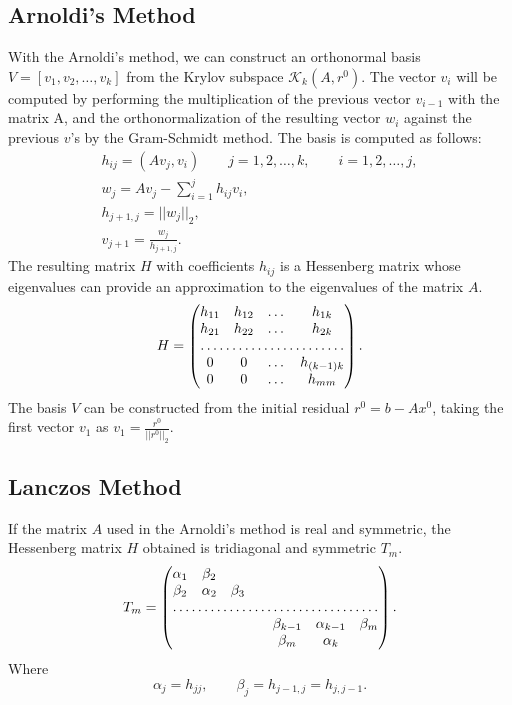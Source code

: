 \documentclass[a4paper,10pt]{report}
\begin{document}
\subsection{Arnoldi's Method}
With the Arnoldi’s method, we can construct an orthonormal basis $V=[v_1,v_2,\dots, v_k]$ from the Krylov subspace $\mathcal{K}_k(A,r^0)$.
The vector $v_i$ will be computed by performing the multiplication of the previous vector $v_{i-1}$ with the matrix A, and the orthonormalization of the resulting vector $w_i$ against the previous $v$’s by the Gram-Schmidt method. The basis is computed as follows:
\begin{gather*}
h_{ij}=(Av_j,v_i)\qquad j=1,2,\dots, k,\qquad i=1,2,\dots,j,\\
w_j=Av_j-\sum_{i=1}^jh_{ij}v_i,\\
h_{j+1,j}=||w_j||_2,\\
v_{j+1}=\frac{w_j}{h_{j+1,j}}.
\end{gather*}
The resulting matrix $H$ with coefficients $h_{ij}$ is a Hessenberg matrix  whose eigenvalues can provide an approximation to the eigenvalues of the matrix $A$.
\begin{equation*}
H=
\begin{pmatrix}
h_{11} & h_{12} &\dots  & h_{1k} \\
h_{21} & h_{22} &\dots  & h_{2k} \\
\hdotsfor{4}\\
0  &0 &\dots  &h_{(k-1)k} \\
0   &0 &\dots & h_{mm}
\end{pmatrix}.
\end{equation*}
The basis $V$ can be constructed from the initial residual $r^0=b-Ax^0$, taking the first vector $v_1$ as
$v_1=\frac{r^0}{||r^0||_2}$.


\subsection{Lanczos Method}
If the matrix $A$ used in the Arnoldi's method is real and symmetric, the Hessenberg matrix $H$ obtained is tridiagonal and symmetric $T_m$.
\begin{equation*}
T_m=
\begin{pmatrix}
\alpha_{1} & \beta_{2}  \\
\beta_{2} & \alpha_{2} &\beta_3 \\
\hdotsfor{7}\\
 & & & &\beta_{k-1} &\alpha_{k-1} &\beta_m \\
 & & & &\beta_m & \alpha_{k}
\end{pmatrix}.
\end{equation*}
Where
\begin{equation*}
 \alpha_j=h_{jj}, \qquad \beta_j=h_{j-1,j}=h_{j,j-1}.  
\end{equation*}
\end{document}
